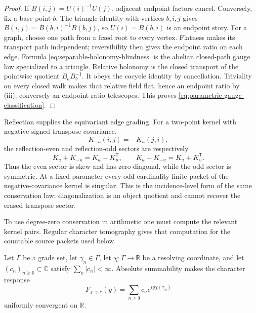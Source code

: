 \documentclass[11pt]{article}
\theoremstyle{definition}
\theoremstyle{remark}
\newcommand{\C}{\mathbb C}
\newcommand{\R}{\mathbb R}
\begin{document}
\begin{proof}
If \(B(i,j)=U(i)^{-1}U(j)\), adjacent endpoint factors cancel.  Conversely,
fix a base point \(b\).  The triangle identity with vertices \(b,i,j\) gives
\(B(i,j)=B(b,i)^{-1}B(b,j)\), so \(U(i)=B(b,i)\) is an endpoint story.
For a graph, choose one path from a fixed root to every vertex.  Flatness
makes its transport path independent; reversibility then gives the endpoint
ratio on each edge.  Formula \eqref{eq:separable-holonomy-blindness} is the
abelian closed-path gauge law specialized to a triangle.  Relative holonomy
is the closed transport of the pointwise quotient \(B_aB_b^{-1}\).  It obeys
the cocycle identity by cancellation.  Triviality on every closed walk makes
that relative field flat, hence an endpoint ratio by (iii); conversely an
endpoint ratio telescopes.  This proves
\eqref{eq:parametric-gauge-classification}.
\end{proof}

Reflection supplies the equivariant edge grading.  For a two-point kernel
with negative signed-transpose covariance,
\[
                         K_{-u}(i,j)=-K_u(j,i),
\tag{2.H3}\label{eq:negative-signed-transpose}
\]
the reflection-even and reflection-odd sectors are respectively
\[
 K_u+K_{-u}=K_u-K_u^{\mathsf T},\qquad
 K_u-K_{-u}=K_u+K_u^{\mathsf T}.
\tag{2.H4}\label{eq:signed-transpose-sectors}
\]
Thus the even sector is skew and has zero diagonal, while the odd sector is
symmetric.  At a fixed parameter every odd-cardinality finite packet of the
negative-covariance kernel is singular.  This is the incidence-level form of
the same conservation law: diagonalization is an object quotient and cannot
recover the erased transpose sector.

To use degree-zero conservation in arithmetic one must compute the relevant
kernel pairs.  Regular character tomography gives that computation for the
countable source packets used below.

Let \(\Gamma\) be a grade set, let \(\gamma_n\in\Gamma\), let
\(\chi:\Gamma\to\R\) be a resolving coordinate, and let
\((c_n)_{n\ge0}\subset\C\) satisfy \(\sum_n|c_n|<\infty\).  Absolute
summability makes the character response
\[
       F_{\chi,\gamma,c}(y)
       =\sum_{n\ge0}c_n e^{iy\chi(\gamma_n)}
\tag{2.T0}\label{eq:regular-character-response}
\]
uniformly convergent on \(\R\).
\end{document}
